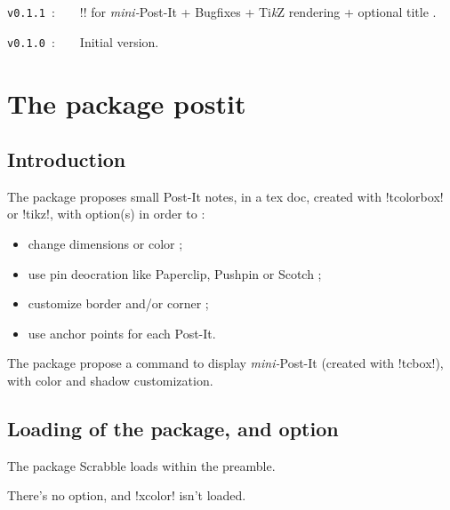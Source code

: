 \documentclass[english,a4paper,11pt]{article}
\providecommand\tikzlogo{Ti\textit{k}Z}
\let\TikZ\tikzlogo
\begin{document}
\verb|v0.1.1|~:~~~~\motcletex!\vphantom! for \textit{mini-}Post-It + Bugfixes + \TikZ{} rendering + optional title .

\verb|v0.1.0|~:~~~~Initial version.

\newpage

\section{The package postit}

\subsection{Introduction}

\begin{noteblock}
The package proposes small Post-It notes, in a \textsf{tex} doc, created with \packagetex!tcolorbox! or \packagetex!tikz!, with option(s) in order to :

\begin{itemize}
	\item change dimensions or color ;
	\item use pin deocration like Paperclip, Pushpin or Scotch ;
	\item customize border and/or corner ;
	\item use anchor points for each Post-It.
\end{itemize}

The package propose a command to display \textit{mini-}Post-It (created with \motcletex!tcbox!), with color and shadow customization.
\end{noteblock}

\subsection{Loading of the package, and option}

\begin{importantblock}
The package Scrabble loads within the preamble.

There's no option, and \packagetex!xcolor! isn't loaded.
\end{importantblock}

\end{document}

